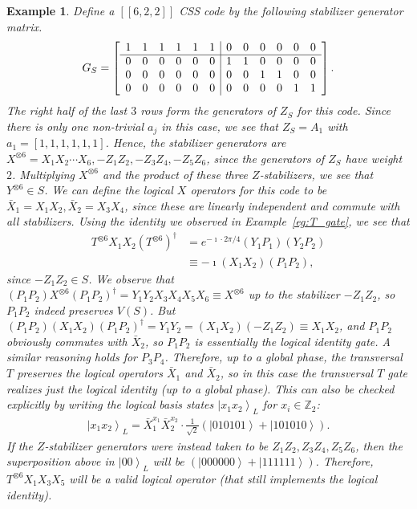 \documentclass[twoside,romanappendices]{IEEEtran}
\newtheorem{example}{Example}
\newcommand{\ket}[1]{\left\lvert #1 \right\rangle}
\newcommand{\llbr}{[\![}
\newcommand{\rrbr}{]\!]}
\begin{document}
\begin{example}
\label{eg:cssT_622}
\normalfont
Define a $\llbr 6,2,2 \rrbr$ CSS code by the following stabilizer generator matrix.
\begin{align}
\setlength\aboverulesep{0pt}\setlength\belowrulesep{0pt}
    \setlength\cmidrulewidth{0.5pt}
G_S = 
\left[
\begin{array}{cccccc|cccccc}
1 & 1 & 1 & 1 & 1 & 1 & 0 & 0 & 0 & 0 & 0 & 0 \\
\hline 
0 & 0 & 0 & 0 & 0 & 0 & 1 & 1 & 0 & 0 & 0 & 0 \\
0 & 0 & 0 & 0 & 0 & 0 & 0 & 0 & 1 & 1 & 0 & 0 \\
0 & 0 & 0 & 0 & 0 & 0 & 0 & 0 & 0 & 0 & 1 & 1 \\
\end{array}
\right].
\end{align}
The right half of the last $3$ rows form the generators of $Z_S$ for this code.
Since there is only one non-trivial $a_j$ in this case, we see that $Z_S = A_1$ with $a_1 = [1,1,1,1,1,1]$.
Hence, the stabilizer generators are $X^{\otimes 6} = X_1 X_2 \cdots X_6, - Z_1 Z_2, - Z_3 Z_4, - Z_5 Z_6$, since the generators of $Z_S$ have weight $2$.
Multiplying $X^{\otimes 6}$ and the product of these three $Z$-stabilizers, we see that $Y^{\otimes 6} \in S$.
We can define the logical $X$ operators for this code to be $\bar{X}_1 = X_1 X_2, \bar{X}_2 = X_3 X_4$, since these are linearly independent and commute with all stabilizers.
Using the identity we observed in Example~\ref{eg:T_gate}, we see that 
\begin{align}
T^{\otimes 6} X_1 X_2 (T^{\otimes 6})^{\dagger} & = e^{-\imath \cdot 2\pi/4} (Y_1 P_1) (Y_2 P_2) \nonumber \\ %
%
  & \equiv -\imath (X_1 X_2) (P_1 P_2),
\end{align}
since $-Z_1 Z_2 \in S$.
We observe that $(P_1 P_2) X^{\otimes 6} (P_1 P_2)^{\dagger} = Y_1 Y_2 X_3 X_4 X_5 X_6 \equiv X^{\otimes 6}$ up to the stabilizer $-Z_1 Z_2$, so $P_1 P_2$ indeed preserves $V(S)$.
But $(P_1 P_2) (X_1 X_2) (P_1 P_2)^{\dagger} = Y_1 Y_2 = (X_1 X_2) (-Z_1 Z_2) \equiv X_1 X_2$, and $P_1 P_2$ obviously commutes with $\bar{X}_2$, so $P_1 P_2$ is essentially the logical identity gate.
A similar reasoning holds for $P_3 P_4$.
Therefore, up to a global phase, the transversal $T$ preserves the logical operators $\bar{X}_1$ and $\bar{X}_2$, so in this case the transversal $T$ gate realizes just the logical identity (up to a global phase).
This can also be checked explicitly by writing the logical basis states $\ket{x_1 x_2}_L$ for $x_i \in \mathbb{Z}_2$:
\begin{align}
\ket{x_1 x_2}_L = \bar{X}_1^{x_1} \bar{X}_2^{x_2} \cdot \frac{1}{\sqrt{2}} \left( \ket{010101} + \ket{101010} \right).
\end{align}
If the $Z$-stabilizer generators were instead taken to be $Z_1 Z_2, Z_3 Z_4, Z_5 Z_6$, then the superposition above in $\ket{00}_L$ will be $(\ket{000000} + \ket{111111})$.
Therefore, $T^{\otimes 6} X_1 X_3 X_5$ will be a valid logical operator (that still implements the logical identity).


\end{example}
\end{document}
